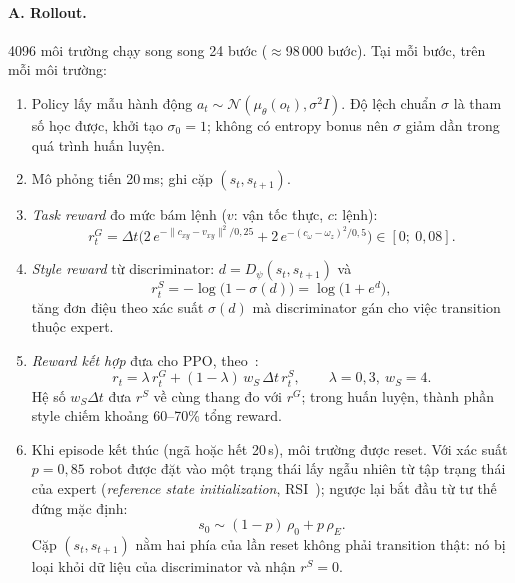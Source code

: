\paragraph{A. Rollout.} 4096 môi trường chạy song song 24 bước ($\approx$98\,000 bước). Tại
mỗi bước, trên mỗi môi trường:
\begin{enumerate}[leftmargin=*,itemsep=2pt]
  \item Policy lấy mẫu hành động $a_t \sim \mathcal{N}(\mu_\theta(o_t), \sigma^2 I)$. Độ lệch
    chuẩn $\sigma$ là tham số học được, khởi tạo $\sigma_0 = 1$; không có entropy bonus nên
    $\sigma$ giảm dần trong quá trình huấn luyện.
  \item Mô phỏng tiến 20\,ms; ghi cặp $(s_t, s_{t+1})$.
  \item \emph{Task reward} đo mức bám lệnh ($v$: vận tốc thực, $c$: lệnh):
    \begin{equation}
      r^G_t = \Delta t\Big(2\,e^{-\|c_{xy} - v_{xy}\|^2 / 0{,}25}
      + 2\,e^{-(c_\omega - \omega_z)^2 / 0{,}5}\Big) \in [0;\ 0{,}08].
      \label{eq:task}
    \end{equation}
  \item \emph{Style reward} từ discriminator: $d = D_\psi(s_t, s_{t+1})$ và
    \begin{equation}
      r^S_t = -\log\big(1 - \sigma(d)\big) = \log\big(1 + e^{d}\big),
      \label{eq:gail-reward}
    \end{equation}
    tăng đơn điệu theo xác suất $\sigma(d)$ mà discriminator gán cho việc transition thuộc
    expert.
  \item \emph{Reward kết hợp} đưa cho PPO, theo~\cite{escontrela2022}:
    \begin{equation}
      r_t = \lambda\, r^G_t + (1 - \lambda)\, w_S\,\Delta t\, r^S_t,
      \qquad \lambda = 0{,}3,\ w_S = 4 .
      \label{eq:mix}
    \end{equation}
    Hệ số $w_S \Delta t$ đưa $r^S$ về cùng thang đo với $r^G$; trong huấn luyện, thành phần
    style chiếm khoảng 60--70\% tổng reward.
  \item Khi episode kết thúc (ngã hoặc hết 20\,s), môi trường được reset. Với xác suất
    $p = 0{,}85$ robot được đặt vào một trạng thái lấy ngẫu nhiên từ tập trạng thái của
    expert (\emph{reference state initialization}, RSI~\cite{peng2021amp}); ngược lại bắt
    đầu từ tư thế đứng mặc định:
    \begin{equation}
      s_0 \sim (1 - p)\,\rho_0 + p\,\rho_E .
      \label{eq:rsi}
    \end{equation}
    Cặp $(s_t, s_{t+1})$ nằm hai phía của lần reset không phải transition thật: nó bị loại
    khỏi dữ liệu của discriminator và nhận $r^S = 0$.
\end{enumerate}

